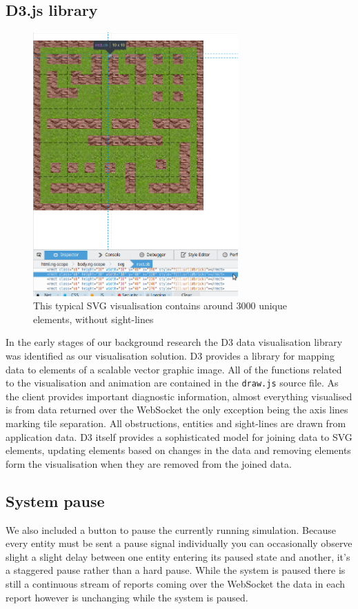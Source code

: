 \subsection{D3.js library}
\begin{figure}[h]
  \centering
  \includegraphics[width=0.7\textwidth]{img/svg-element.png}
\caption{This typical SVG visualisation contains around 3000 unique elements, without sight-lines}
    \label{fig:visualisation}
\end{figure}
In the early stages of our background research the D3 data visualisation library was identified as our visualisation solution. D3 provides a library for mapping data to elements of a scalable vector graphic image. All of the functions related to the visualisation and animation are contained in the \verb+draw.js+ source file. As the client provides important diagnostic information, almost everything visualised is from data returned over the WebSocket the only exception being the axis lines marking tile separation. All obstructions, entities and sight-lines are drawn from application data.
D3 itself provides a sophisticated model for joining data to SVG elements, updating elements based on changes in the data and removing elements form the visualisation when they are removed from the joined data.
\subsection{System pause}
We also included a button to pause the currently running simulation. Because every entity must be sent a pause signal individually you can occasionally observe slight a slight delay between one entity entering its paused state and another, it's a staggered pause rather than a hard pause. While the system is paused there is still a continuous stream of reports coming over the WebSocket the data in each report however is unchanging while the system is paused.
